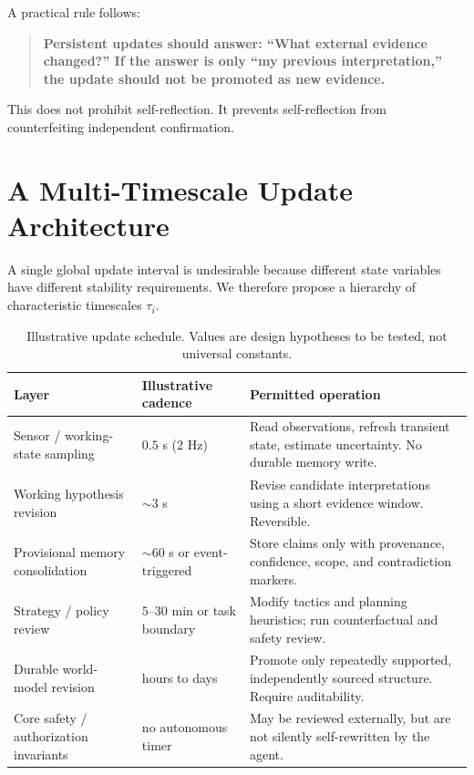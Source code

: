 \documentclass[11pt]{article}
\begin{document}
A practical rule follows:

\begin{quote}
\textbf{Persistent updates should answer: ``What external evidence changed?'' If the answer is only ``my previous interpretation,'' the update should not be promoted as new evidence.}
\end{quote}

This does not prohibit self-reflection. It prevents self-reflection from counterfeiting independent confirmation.

\section{A Multi-Timescale Update Architecture}

A single global update interval is undesirable because different state variables have different stability requirements. We therefore propose a hierarchy of characteristic timescales $\tau_i$.

\begin{table}[H]
\centering
\caption{Illustrative update schedule. Values are design hypotheses to be tested, not universal constants.}
\label{tab:timescales}
\begin{tabular}{>{\raggedright\arraybackslash}p{3.2cm}>{\raggedright\arraybackslash}p{2.6cm}>{\raggedright\arraybackslash}p{7.4cm}}
\toprule
\textbf{Layer} & \textbf{Illustrative cadence} & \textbf{Permitted operation}\\
\midrule
Sensor / working-state sampling & $0.5$ s (2 Hz) & Read observations, refresh transient state, estimate uncertainty. No durable memory write.\\
Working hypothesis revision & $\sim 3$ s & Revise candidate interpretations using a short evidence window. Reversible.\\
Provisional memory consolidation & $\sim 60$ s or event-triggered & Store claims only with provenance, confidence, scope, and contradiction markers.\\
Strategy / policy review & $5$--$30$ min or task boundary & Modify tactics and planning heuristics; run counterfactual and safety review.\\
Durable world-model revision & hours to days & Promote only repeatedly supported, independently sourced structure. Require auditability.\\
Core safety / authorization invariants & no autonomous timer & May be reviewed externally, but are not silently self-rewritten by the agent.\\
\bottomrule
\end{tabular}
\end{table}
\end{document}
